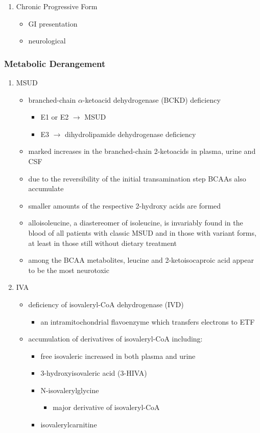 \documentclass{scrartcl}
\begin{document}
\begin{enumerate}
\item Chronic Progressive Form
\label{sec:org7382131}
\begin{itemize}
\item GI presentation
\item neurological
\end{itemize}
\end{enumerate}

\subsubsection{Metabolic Derangement}
\label{sec:orgb0e8254}
\begin{enumerate}
\item MSUD
\label{sec:org5ea70a2}
\begin{itemize}
\item branched-chain \(\alpha\)-ketoacid dehydrogenase (BCKD) deficiency
\begin{itemize}
\item E1 or E2 \(\to\) MSUD
\item E3 \(\to\) dihydrolipamide dehydrogenase deficiency
\end{itemize}

\item marked increases in the branched-chain 2-ketoacids in plasma, urine
and CSF
\item due to the reversibility of the initial transamination step BCAAs
also accumulate
\item smaller amounts of the respective 2-hydroxy acids are formed
\item alloisoleucine, a diastereomer of isoleucine, is invariably found in
the blood of all patients with classic MSUD and in those with
variant forms, at least in those still without dietary treatment
\item among the BCAA metabolites, leucine and 2-ketoisocaproic acid appear
to be the most neurotoxic
\end{itemize}

\item IVA
\label{sec:org33460c6}
\begin{itemize}
\item deficiency of isovaleryl-CoA dehydrogenase (IVD)
\begin{itemize}
\item an intramitochondrial flavoenzyme which transfers electrons to ETF
\end{itemize}
\item accumulation of derivatives of isovaleryl-CoA including:
\begin{itemize}
\item free isovaleric increased in both plasma and urine
\item 3-hydroxyisovaleric acid (3-HIVA)
\item N-isovalerylglycine
\begin{itemize}
\item major derivative of isovaleryl-CoA
\end{itemize}
\item isovalerylcarnitine
\end{itemize}
\end{itemize}


\end{enumerate}
\end{document}
